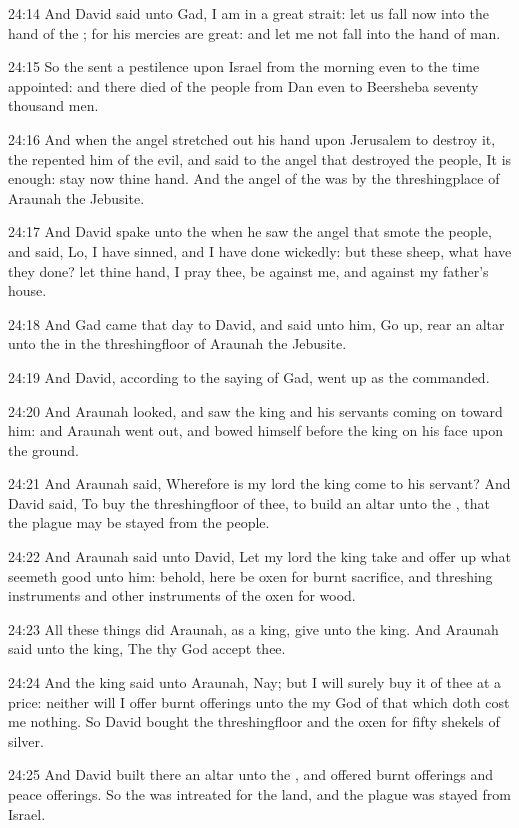 24:14 And David said unto Gad, I am in a great strait: let us fall now into the hand of the \LORD; for his mercies are great: and let me not fall into the hand of man.

24:15 So the \LORD sent a pestilence upon Israel from the morning even to the time appointed: and there died of the people from Dan even to Beersheba seventy thousand men.

24:16 And when the angel stretched out his hand upon Jerusalem to destroy it, the \LORD repented him of the evil, and said to the angel that destroyed the people, It is enough: stay now thine hand. And the angel of the \LORD was by the threshingplace of Araunah the Jebusite.

24:17 And David spake unto the \LORD when he saw the angel that smote the people, and said, Lo, I have sinned, and I have done wickedly: but these sheep, what have they done? let thine hand, I pray thee, be against me, and against my father's house.

24:18 And Gad came that day to David, and said unto him, Go up, rear an altar unto the \LORD in the threshingfloor of Araunah the Jebusite.

24:19 And David, according to the saying of Gad, went up as the \LORD commanded.

24:20 And Araunah looked, and saw the king and his servants coming on toward him: and Araunah went out, and bowed himself before the king on his face upon the ground.

24:21 And Araunah said, Wherefore is my lord the king come to his servant?  And David said, To buy the threshingfloor of thee, to build an altar unto the \LORD, that the plague may be stayed from the people.

24:22 And Araunah said unto David, Let my lord the king take and offer up what seemeth good unto him: behold, here be oxen for burnt sacrifice, and threshing instruments and other instruments of the oxen for wood.

24:23 All these things did Araunah, as a king, give unto the king. And Araunah said unto the king, The \LORD thy God accept thee.

24:24 And the king said unto Araunah, Nay; but I will surely buy it of thee at a price: neither will I offer burnt offerings unto the \LORD my God of that which doth cost me nothing. So David bought the threshingfloor and the oxen for fifty shekels of silver.

24:25 And David built there an altar unto the \LORD, and offered burnt offerings and peace offerings. So the \LORD was intreated for the land, and the plague was stayed from Israel.

